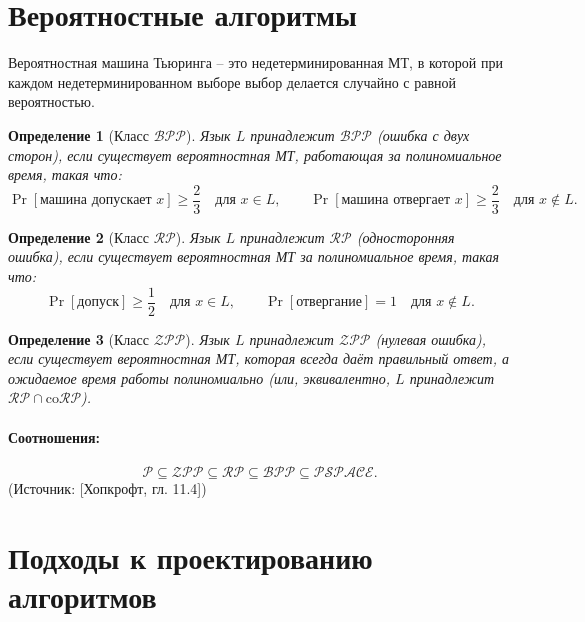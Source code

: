 \documentclass[a4paper,12pt]{article}
\newtheorem{definition}{Определение}
\begin{document}
\section{Вероятностные алгоритмы}
Вероятностная машина Тьюринга – это недетерминированная МТ, в которой при каждом недетерминированном выборе выбор делается случайно с равной вероятностью.
\begin{definition}[Класс $\mathcal{BPP}$]
    Язык $L$ принадлежит $\mathcal{BPP}$ (ошибка с двух сторон), если существует вероятностная МТ, работающая за полиномиальное время, такая что:
    \[
    \Pr[\text{машина допускает } x] \ge \frac{2}{3} \quad \text{для } x \in L,\qquad
    \Pr[\text{машина отвергает } x] \ge \frac{2}{3} \quad \text{для } x \notin L.
    \]
\end{definition}
\begin{definition}[Класс $\mathcal{RP}$]
    Язык $L$ принадлежит $\mathcal{RP}$ (односторонняя ошибка), если существует вероятностная МТ за полиномиальное время, такая что:
    \[
    \Pr[\text{допуск}] \ge \frac{1}{2} \quad \text{для } x \in L,\qquad
    \Pr[\text{отвергание}] = 1 \quad \text{для } x \notin L.
    \]
\end{definition}
\begin{definition}[Класс $\mathcal{ZPP}$]
    Язык $L$ принадлежит $\mathcal{ZPP}$ (нулевая ошибка), если существует вероятностная МТ, которая всегда даёт правильный ответ, а ожидаемое время работы полиномиально (или, эквивалентно, $L$ принадлежит $\mathcal{RP} \cap \mathrm{co}\mathcal{RP}$).
\end{definition}
\paragraph{Соотношения:}
\[
\mathcal{P} \subseteq \mathcal{ZPP} \subseteq \mathcal{RP} \subseteq \mathcal{BPP} \subseteq \mathcal{PSPACE}.
\]
(Источник: [Хопкрофт, гл. 11.4])

\section{Подходы к проектированию алгоритмов}
\end{document}
